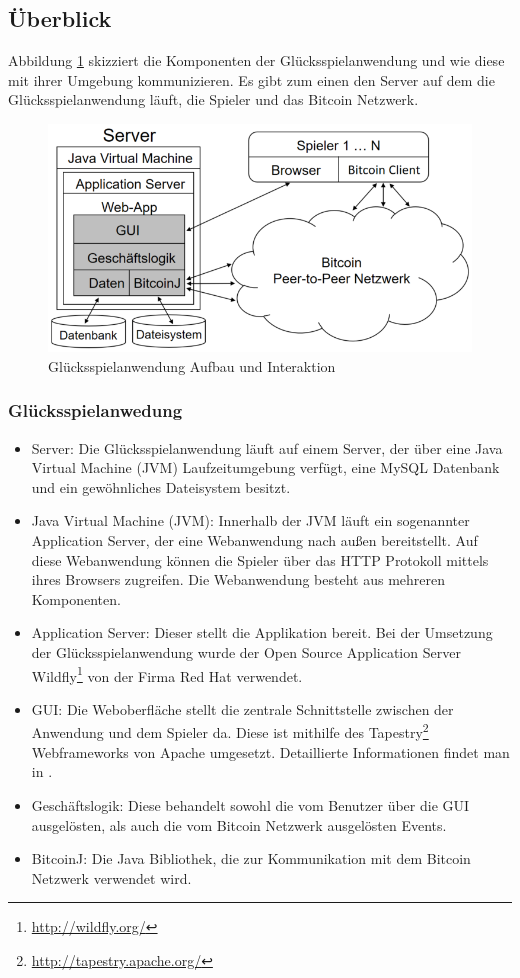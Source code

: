 \subsection{Überblick}

Abbildung \ref{fig:anwendung_aufbau} skizziert die Komponenten der Glücksspielanwendung und wie diese mit ihrer Umgebung kommunizieren. Es gibt zum einen den Server auf dem die Glücksspielanwendung läuft, die Spieler und das Bitcoin Netzwerk.

\begin{figure}[H]
\centering
\includegraphics[width=1\linewidth]{Figures/umsetzung_btc/anwendung_aufbau}
\decoRule
\caption{Glücksspielanwendung Aufbau und Interaktion}
\label{fig:anwendung_aufbau}
\end{figure}

\subsubsection{Glücksspielanwedung}
\begin{itemize}
\item Server: Die Glücksspielanwendung läuft auf einem Server, der über eine Java Virtual Machine (JVM) Laufzeitumgebung verfügt, eine MySQL Datenbank und ein gewöhnliches Dateisystem besitzt.
\item Java Virtual Machine (JVM): Innerhalb der JVM läuft ein sogenannter Application Server, der eine Webanwendung nach außen bereitstellt. Auf diese Webanwendung können die Spieler über das HTTP Protokoll mittels ihres Browsers zugreifen. Die Webanwendung besteht aus mehreren Komponenten.
\item Application Server: Dieser stellt die Applikation bereit. Bei der Umsetzung der Glücksspielanwendung wurde der Open Source Application Server Wildfly\footnote{\url{http://wildfly.org/}} von der Firma Red Hat verwendet.
\item GUI: Die Weboberfläche stellt die zentrale Schnittstelle zwischen der Anwendung und dem Spieler da. Diese ist mithilfe des Tapestry\footnote{\url{http://tapestry.apache.org/}} Webframeworks von Apache umgesetzt. Detaillierte Informationen findet man in \citep{tapestry}.
\item Geschäftslogik: Diese behandelt sowohl die vom Benutzer über die GUI ausgelösten, als auch die vom Bitcoin Netzwerk ausgelösten Events.
\item BitcoinJ: Die Java Bibliothek, die zur Kommunikation mit dem Bitcoin Netzwerk verwendet wird.
\end{itemize}

